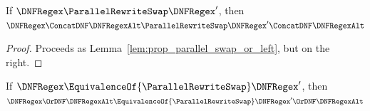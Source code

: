 \documentclass[sigplan,acmsmall]{acmart}
\begin{document}
\begin{lemma}
  If $\DNFRegex \ParallelRewriteSwap \DNFRegex'$, then\\
  $\DNFRegex \ConcatDNF \DNFRegexAlt \ParallelRewriteSwap \DNFRegex'
  \ConcatDNF \DNFRegexAlt$
\end{lemma}
\begin{proof}
  Proceeds as Lemma~\ref{lem:prop_parallel_swap_or_left}, but on the right.
\end{proof}

\begin{lemma}
  \label{lem:prop-eq-swap-or-left}
  If $\DNFRegex \EquivalenceOf{\ParallelRewriteSwap} \DNFRegex'$, then
  $\DNFRegex \OrDNF \DNFRegexAlt \EquivalenceOf{\ParallelRewriteSwap} \DNFRegex'
  \OrDNF \DNFRegexAlt$
\end{lemma}
\end{document}
